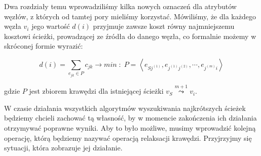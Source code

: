 Dwa rozdziały temu wprowadziliśmy kilka nowych oznaczeń dla atrybutów węzłów, z których od tamtej pory mieliśmy korzystać. Mówiliśmy, że dla każdego węzła $v_{i}$ jego wartość $d \left( i \right) $ przyjmuje zawsze koszt równy najmniejszemu kosztowi ścieżki, prowadzącej ze źródła do danego węzła, co formalnie możemy w skróconej formie wyrazić:

\begin{equation}
d \left( i \right) = \sum_{e_{jk} \in P} c_{jk} \rightarrow min\; : \; P = \left \langle e_{Sj^{ \left( 1 \right) }}, e_{j^{ \left( 1 \right) } j^{ \left( 2 \right) }}, \cdots, e_{j^{ \left( m \right) } i } \right \rangle
\end{equation}

gdzie $P$ jest zbiorem krawędzi dla istniejącej ścieżki $v_{S} \overset{m+1}\leadsto v_{i}$.

W czasie działania wszystkich algorytmów wyszukiwania najkrótszych ścieżek będziemy chcieli zachować tą własność, by w momencie zakończenia ich działania otrzymywać poprawne wyniki. Aby to było możliwe, musimy wprowadzić kolejną operację, którą będziemy nazywać operacją relaksacji krawędzi. Przyjrzyjmy się sytuacji, która zobrazuje jej działanie.


